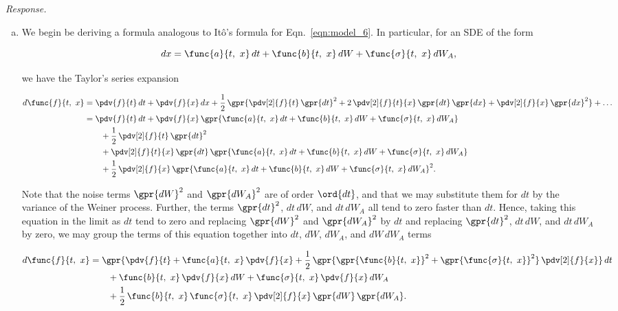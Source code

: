 \textit{Response.}

\begin{enumerate}[a)]
	\item We begin be deriving a formula analogous to It\^{o}'s formula for Eqn.~\ref{eqn:model_6}. In particular, for an SDE of the form

	\begin{equation}
		dx = \func{a}{t,\ x}\,dt + \func{b}{t,\ x}\,dW + \func{\sigma}{t,\ x}\,dW_A,
	\end{equation}		
	
	we have the Taylor's series expansion
	
	\begin{align}
		d\func{f}{t,\ x} &= \pdv{f}{t}\,dt + \pdv{f}{x}\,dx + \frac{1}{2}\,\gpr{\pdv[2]{f}{t}\,\gpr{dt}^2 + 2\,\pdv[2]{f}{t}{x}\,\gpr{dt}\,\gpr{dx} + \pdv[2]{f}{x}\,\gpr{dx}^2} + \dots \nonumber \\
			&= \pdv{f}{t}\,dt + \pdv{f}{x}\,\gpr{\func{a}{t,\ x}\,dt + \func{b}{t,\ x}\,dW + \func{\sigma}{t,\ x}\,dW_A} \nonumber \\
				&\qquad + \frac{1}{2}\,\pdv[2]{f}{t}\,\gpr{dt}^2 \nonumber \\
				&\qquad + \pdv[2]{f}{t}{x}\,\gpr{dt}\,\gpr{\func{a}{t,\ x}\,dt + \func{b}{t,\ x}\,dW + \func{\sigma}{t,\ x}\,dW_A} \nonumber \\
				&\qquad + \frac{1}{2}\,\pdv[2]{f}{x}\,\gpr{\func{a}{t,\ x}\,dt + \func{b}{t,\ x}\,dW + \func{\sigma}{t,\ x}\,dW_A}^2.
	\end{align}
	
	Note that the noise terms $\gpr{dW}^2$ and $\gpr{d{W_{A}}}^2$ are of order $\ord{dt}$, and that we may substitute them for $dt$ by the variance of the Weiner process. Further, the terms $\gpr{dt}^2$, $dt\,dW$, and $dt\,d{W_A}$ all tend to zero faster than $dt$. Hence, taking this equation in the limit as $dt$ tend to zero and replacing $\gpr{dW}^2$ and $\gpr{d{W_{A}}}^2$ by $dt$ and replacing $\gpr{dt}^2$, $dt\,dW$, and $dt\,d{W_A}$ by zero, we may group the terms of this equation together into $dt$, $dW$, $dW_{A}$, and $dW\,dW_{A}$ terms
	
	\begin{align}
		d\func{f}{t,\ x} &= \gpr{\pdv{f}{t} + \func{a}{t,\ x}\,\pdv{f}{x} + \frac{1}{2}\,\gpr{\gpr{\func{b}{t,\ x}}^2 + \gpr{\func{\sigma}{t,\ x}}^2}\,\pdv[2]{f}{x}}\,dt \nonumber \\
				&\qquad + \func{b}{t,\ x}\,\pdv{f}{x}\,dW + \func{\sigma}{t,\ x}\,\pdv{f}{x}\,dW_A \nonumber \\
				&\qquad + \frac{1}{2}\,\func{b}{t,\ x}\,\func{\sigma}{t,\ x}\,\pdv[2]{f}{x}\,\gpr{dW}\,\gpr{dW_{A}}. \label{eqn:model_6_ito}
	\end{align}
	

\end{enumerate}
